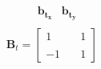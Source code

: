 \documentclass[preview]{standalone}
\begin{document}
\begin{align*}
\begin{array}{c}\begin{matrix}\hspace{1cm} \mathbf{b_{t_x}} & \mathbf{b_{t_y}} \end{matrix} \\  \mathbf{B}_t = \begin{bmatrix} 1 & \quad 1 \\ \\-1 & \quad 1 \end{bmatrix} \end{array}
\end{align*}
\end{document}
